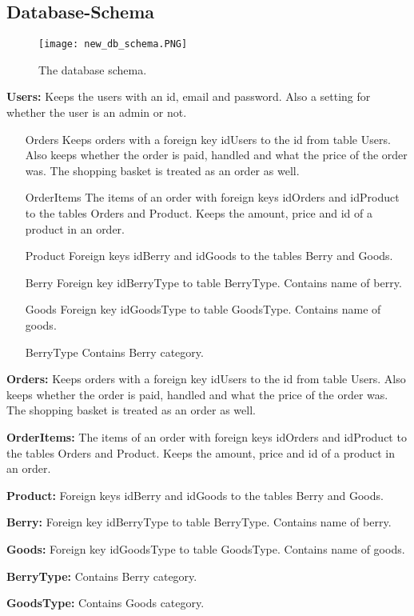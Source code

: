 \newpage

\subsection{Database-Schema}

\begin{figure}[H]
  \centering
  \texttt{[image: new\_db\_schema.PNG]}
  \caption{\label{fig:schema} The database schema.}
\end{figure}


\textbf{Users:} Keeps the users with an id, email and password. Also a
setting for whether the user is an admin or not.

\begin{itemize}
  \item[Orders] Keeps orders with a foreign key idUsers to the
    id from table Users. Also keeps whether the order is paid, handled and
    what the price of the order was. The shopping basket is treated as an
    order as well.
  \item[OrderItems] The items of an order with foreign keys idOrders and
    idProduct to the tables Orders and Product.  Keeps the amount, price
    and id of a product in an order.
  \item[Product] Foreign keys idBerry and idGoods to the tables
    Berry and Goods.
  \item[Berry] Foreign key idBerryType to table BerryType. Contains
    name of berry.
  \item[Goods] Foreign key idGoodsType to table GoodsType. Contains
    name of goods.
  \item[BerryType] Contains Berry category.
\end{itemize}

\noindent\textbf{Orders:} Keeps orders with a foreign key idUsers to the
id from table Users. Also keeps whether the order is paid, handled and what
the price of the order was. The shopping basket is treated as an order as well.

\noindent\textbf{OrderItems:} The items of an order with foreign keys
idOrders and idProduct to the tables Orders and Product.  Keeps the amount,
price and id of a product in an order.

\noindent\textbf{Product:} Foreign keys idBerry and idGoods to the tables
Berry and Goods.

\noindent\textbf{Berry:} Foreign key idBerryType to table BerryType. Contains
name of berry.

\noindent\textbf{Goods:} Foreign key idGoodsType to table GoodsType. Contains
name of goods.

\noindent\textbf{BerryType:} Contains Berry category.

\noindent\textbf{GoodsType:} Contains Goods category.
